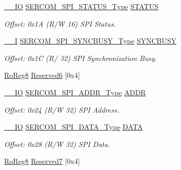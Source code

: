 \begin{DoxyCompactItemize}
\item 
\mbox{\hyperlink{core__cm0plus_8h_aec43007d9998a0a0e01faede4133d6be}{\+\_\+\+\_\+\+IO}} \mbox{\hyperlink{union_s_e_r_c_o_m___s_p_i___s_t_a_t_u_s___type}{S\+E\+R\+C\+O\+M\+\_\+\+S\+P\+I\+\_\+\+S\+T\+A\+T\+U\+S\+\_\+\+Type}} \mbox{\hyperlink{struct_sercom_spi_a76b4de4989697eed6eb07d0dffd09252}{S\+T\+A\+T\+US}}
\begin{DoxyCompactList}\small\item\em Offset\+: 0x1A (R/W 16) S\+PI Status. \end{DoxyCompactList}\item 
\mbox{\hyperlink{core__cm0plus_8h_af63697ed9952cc71e1225efe205f6cd3}{\+\_\+\+\_\+I}} \mbox{\hyperlink{union_s_e_r_c_o_m___s_p_i___s_y_n_c_b_u_s_y___type}{S\+E\+R\+C\+O\+M\+\_\+\+S\+P\+I\+\_\+\+S\+Y\+N\+C\+B\+U\+S\+Y\+\_\+\+Type}} \mbox{\hyperlink{struct_sercom_spi_a29788de66b216fe3d3699ae808e2abaa}{S\+Y\+N\+C\+B\+U\+SY}}
\begin{DoxyCompactList}\small\item\em Offset\+: 0x1C (R/ 32) S\+PI Synchronization Busy. \end{DoxyCompactList}\item 
\mbox{\hyperlink{group___s_a_m_d21_e15_a__definitions_ga0d957f1433aaf5d70e4dc2b68288442d}{Ro\+Reg8}} \mbox{\hyperlink{struct_sercom_spi_a90ebeceec1a70581f0fc4da2e250e4a6}{Reserved6}} \mbox{[}0x4\mbox{]}
\item 
\mbox{\hyperlink{core__cm0plus_8h_aec43007d9998a0a0e01faede4133d6be}{\+\_\+\+\_\+\+IO}} \mbox{\hyperlink{union_s_e_r_c_o_m___s_p_i___a_d_d_r___type}{S\+E\+R\+C\+O\+M\+\_\+\+S\+P\+I\+\_\+\+A\+D\+D\+R\+\_\+\+Type}} \mbox{\hyperlink{struct_sercom_spi_adfdc8e8f97d66429ed66d6186409c560}{A\+D\+DR}}
\begin{DoxyCompactList}\small\item\em Offset\+: 0x24 (R/W 32) S\+PI Address. \end{DoxyCompactList}\item 
\mbox{\hyperlink{core__cm0plus_8h_aec43007d9998a0a0e01faede4133d6be}{\+\_\+\+\_\+\+IO}} \mbox{\hyperlink{union_s_e_r_c_o_m___s_p_i___d_a_t_a___type}{S\+E\+R\+C\+O\+M\+\_\+\+S\+P\+I\+\_\+\+D\+A\+T\+A\+\_\+\+Type}} \mbox{\hyperlink{struct_sercom_spi_a4e619fb38ebdb89eeae0aa33acb584d1}{D\+A\+TA}}
\begin{DoxyCompactList}\small\item\em Offset\+: 0x28 (R/W 32) S\+PI Data. \end{DoxyCompactList}\item 
\mbox{\hyperlink{group___s_a_m_d21_e15_a__definitions_ga0d957f1433aaf5d70e4dc2b68288442d}{Ro\+Reg8}} \mbox{\hyperlink{struct_sercom_spi_ae82b04b7b2597664c1ab9857a0bbcb50}{Reserved7}} \mbox{[}0x4\mbox{]}

\end{DoxyCompactItemize}
